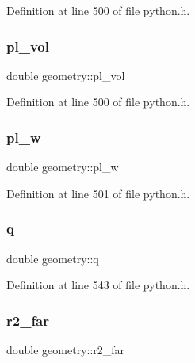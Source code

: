 Definition at line 500 of file python.\+h.

\mbox{\label{structgeometry_a75aa5a138eaaeb26abdf52bd03dc096a}} 
\subsubsection{\texorpdfstring{pl\+\_\+vol}{pl\_vol}}
{\footnotesize\ttfamily double geometry\+::pl\+\_\+vol}



Definition at line 500 of file python.\+h.

\mbox{\label{structgeometry_aa6b11137b5640890d422ec8295f3db28}} 
\subsubsection{\texorpdfstring{pl\+\_\+w}{pl\_w}}
{\footnotesize\ttfamily double geometry\+::pl\+\_\+w}



Definition at line 501 of file python.\+h.

\mbox{\label{structgeometry_a9add8f7045344c49daa6d2a8495152de}} 
\subsubsection{\texorpdfstring{q}{q}}
{\footnotesize\ttfamily double geometry\+::q}



Definition at line 543 of file python.\+h.

\mbox{\label{structgeometry_ada763dad8c3dca01e2e3cce4a110edb3}} 
\subsubsection{\texorpdfstring{r2\+\_\+far}{r2\_far}}
{\footnotesize\ttfamily double geometry\+::r2\+\_\+far}



